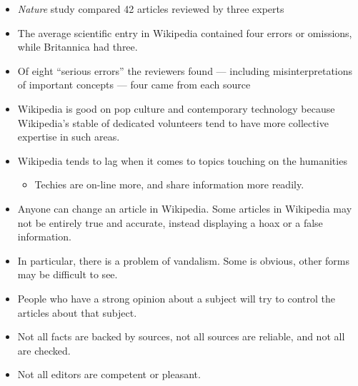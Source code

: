 \documentclass[a4paper,landscape,headrule,footrule,xetex]{foils}
\begin{document}
\begin{itemize}
\item \textit{Nature} study compared 42 articles reviewed by three experts

\item The average scientific entry in Wikipedia contained four errors
  or omissions, while Britannica had three.
\item Of eight ``serious errors'' the reviewers found — including misinterpretations of important concepts — four came from each source
\item Wikipedia is good on pop culture and contemporary technology
  because Wikipedia's stable of dedicated volunteers tend to have more
  collective expertise in such areas.
\item Wikipedia  tends to lag when it comes to topics touching on the humanities 
  \begin{itemize}
  \item Techies are on-line more, and share information more readily.
  \end{itemize}
\end{itemize}

\begin{itemize}
\item Anyone can change an article in Wikipedia. Some articles in
  Wikipedia may not be entirely true and accurate, instead displaying
  a hoax or a false information.
\item In particular, there is a problem of vandalism. Some  is obvious,
  other forms  may be difficult to see.
\item People who have a strong opinion about a subject will try to
  control the articles about that subject.
\item Not all facts are backed by sources, not all sources are
  reliable, and not all are checked.
\item Not all editors are competent or pleasant. 
\end{itemize}
\end{document}
